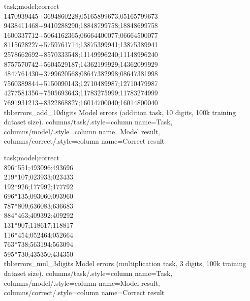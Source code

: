{
	task;model;correct\\
	1470939445+3694860228;05165899673;05165799673\\
	9438411468+9410288290;18848799758;18848699758\\
	1600337712+5064162365;06664400077;06664500077\\
	8115628227+5759761714;13875399941;13875389941\\
	2578662692+8570333548;11149996240;11148996240\\
	8757570742+5604529187;14362199929;14362099929\\
	4847761430+3799620568;08647382998;08647381998\\
	7560389844+5150090143;12710489987;12710479987\\
	4277581356+7505693643;11783275999;11783274999\\
	7691931213+8322868827;16014700040;16014800040\\
}
{tbl:errors_add_10digits}
{
	Model errors (addition task, 10 digits, 100k training dataset size).
}
{
	columns/task/.style={column name={Task}},
	columns/model/.style={column name={Model result}},
	columns/correct/.style={column name={Correct result}}
}


{
	task;model;correct\\
	896*551;493096;493696\\
	219*107;023933;023433\\
	192*926;177992;177792\\
	696*135;093060;093960\\
	787*809;636083;636683\\
	884*463;409392;409292\\
	131*907;118617;118817\\
	116*454;052464;052664\\
	763*738;563194;563094\\
	595*730;435350;434350\\
}
{tbl:errors_mul_3digits}
{
	Model errors (multiplication task, 3 digits, 100k training dataset size).
}
{
	columns/task/.style={column name={Task}},
	columns/model/.style={column name={Model result}},
	columns/correct/.style={column name={Correct result}}
}

